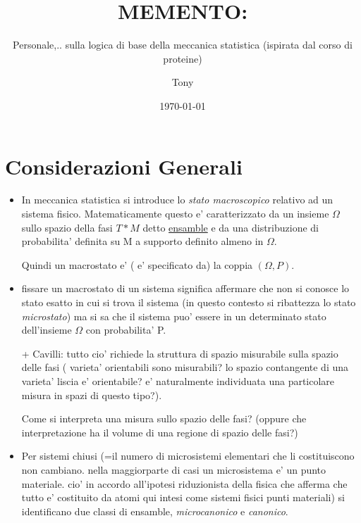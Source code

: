\documentclass[a4paper,12pt]{scrartcl}    %
\begin{document}
	\title{MEMENTO:}
	\subtitle{Personale,.. sulla logica di base della meccanica statistica (ispirata dal corso di proteine)}
	\author{Tony}
	\date{\today}
\maketitle

\section{Considerazioni Generali}
\begin{itemize}

\item In meccanica statistica si introduce lo \emph{stato macroscopico} relativo ad un sistema fisico.
Matematicamente questo e' caratterizzato da un insieme $\Omega$ sullo spazio della fasi $T*M$ detto  \href{http://it.wikipedia.org/wiki/Insieme_statistico}{ensamble} e da una distribuzione di probabilita' definita su M a supporto definito almeno in $\Omega$.

Quindi un macrostato e' ( e' specificato da) la coppia $( \Omega , P )$.

\item fissare un macrostato di un sistema significa affermare che non si conosce lo stato esatto in cui si trova il sistema (in questo contesto si ribattezza lo stato \emph{microstato}) ma si sa che il sistema puo' essere in un determinato stato dell'insieme $\Omega$  con probabilita' P.



\item[+] Cavilli: tutto cio' richiede la struttura di spazio misurabile sulla spazio delle fasi ( varieta' orientabili sono misurabili? lo spazio contangente di una varieta' liscia e' orientabile? e' naturalmente individuata una particolare misura in spazi di questo tipo?).

Come si interpreta una misura sullo spazio delle fasi? (oppure che interpretazione ha il volume di una regione di spazio delle fasi?)







\item Per sistemi chiusi (=il numero di microsistemi elementari che li costituiscono non cambiano. nella maggiorparte di casi un microsistema e' un punto materiale. cio' in accordo all'ipotesi riduzionista della fisica che afferma che tutto e' costituito da atomi qui intesi come sistemi fisici punti materiali) si identificano due classi di ensamble, \emph{microcanonico} e \emph{canonico}.


\end{itemize}
\end{document}
